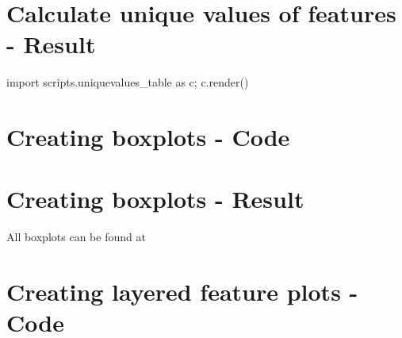 \clearpage

\section{Calculate unique values of features - Result} %
\label{app:result-unique-values}
{\small\sffamily
\begin{python}
    import scripts.uniquevalues_table as c; c.render()
\end{python}
}

\clearpage

\section{Creating boxplots - Code} %
\label{app:source-boxplots}

\clearpage

\section{Creating boxplots - Result} %
\label{app:result-boxplots}
All boxplots can be found at 

\clearpage

\section{Creating layered feature plots - Code} %
\label{app:source-layered-feature-plots}

\clearpage

